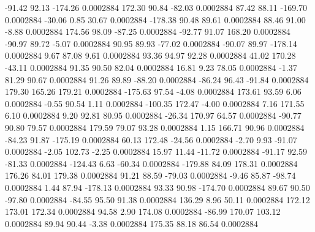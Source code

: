       -91.42       92.13     -174.26     0.0002884
      172.30       90.84      -82.03     0.0002884
       87.42       88.11     -169.70     0.0002884
      -30.06        0.85       30.67     0.0002884
     -178.38       90.48       89.61     0.0002884
       88.46       91.00       -8.88     0.0002884
      174.56       98.09      -87.25     0.0002884
      -92.77       91.07      168.20     0.0002884
      -90.97       89.72       -5.07     0.0002884
       90.95       89.93      -77.02     0.0002884
      -90.07       89.97     -178.14     0.0002884
        9.67       87.08        9.61     0.0002884
       93.36       94.97       92.28     0.0002884
       41.02      170.28      -43.11     0.0002884
       91.35       90.50       82.04     0.0002884
       16.81        9.23       78.05     0.0002884
       -1.37       81.29       90.67     0.0002884
       91.26       89.89      -88.20     0.0002884
      -86.24       96.43      -91.84     0.0002884
      179.30      165.26      179.21     0.0002884
     -175.63       97.54       -4.08     0.0002884
      173.61       93.59        6.06     0.0002884
       -0.55       90.54        1.11     0.0002884
     -100.35      172.47       -4.00     0.0002884
        7.16      171.55        6.10     0.0002884
        9.20       92.81       80.95     0.0002884
      -26.34      170.97       64.57     0.0002884
      -90.77       90.80       79.57     0.0002884
      179.59       79.07       93.28     0.0002884
        1.15      166.71       90.96     0.0002884
      -84.23       91.87     -175.19     0.0002884
       60.13      172.48      -24.56     0.0002884
       -2.70        9.93      -91.07     0.0002884
       -2.05      102.73       -2.25     0.0002884
       15.97       11.44      -11.72     0.0002884
      -91.17       92.59      -81.33     0.0002884
     -124.43        6.63      -60.34     0.0002884
     -179.88       84.09      178.31     0.0002884
      176.26       84.01      179.38     0.0002884
       91.21       88.59      -79.03     0.0002884
       -9.46       85.87      -98.74     0.0002884
        1.44       87.94     -178.13     0.0002884
       93.33       90.98     -174.70     0.0002884
       89.67       90.50      -97.80     0.0002884
      -84.55       95.50       91.38     0.0002884
      136.29        8.96       50.11     0.0002884
      172.12      173.01      172.34     0.0002884
       94.58        2.90      174.08     0.0002884
      -86.99      170.07      103.12     0.0002884
       89.94       90.44       -3.38     0.0002884
      175.35       88.18       86.54     0.0002884

